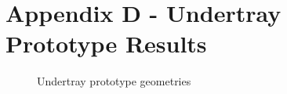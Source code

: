 \newpage
\flushleft
\section*{Appendix D - Undertray Prototype Results} 

\begin{figure}
    \centering
    \noindent{}
    \caption{Undertray prototype geometries}
    \label{fig:UTP_D}
\end{figure}